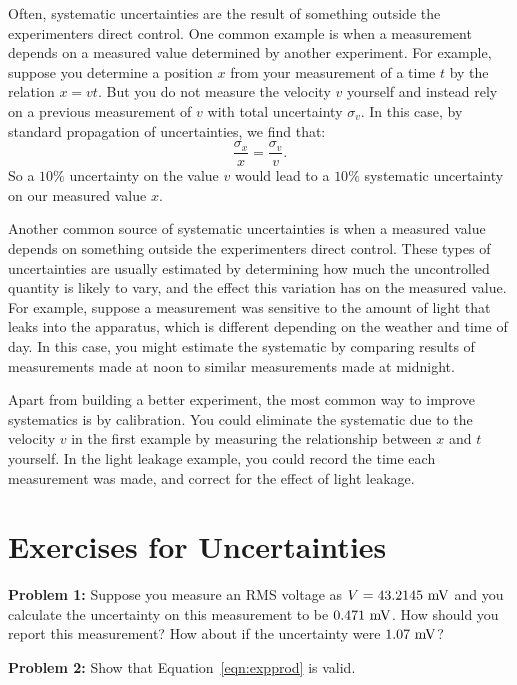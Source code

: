 \documentclass[12pt,oneside]{book}
\begin{document}
Often, systematic uncertainties are the result of something outside
the experimenters direct control.  One common example is when a
measurement depends on a measured value determined by another
experiment.  For example, suppose you determine a position $x$ from
your measurement of a time $t$ by the relation $x = v t$.  But you do
not measure the velocity $v$ yourself and instead rely on a previous
measurement of $v$ with total uncertainty $\sigma_v$.  In this case,
by standard propagation of uncertainties, we find that:
\begin{displaymath}
\frac{\sigma_x}{x} = \frac{\sigma_v}{v}.
\end{displaymath}
So a $10\%$ uncertainty on the value $v$ would lead to a $10\%$ systematic uncertainty on our measured value $x$.

Another common source of systematic uncertainties is when a measured
value depends on something outside the experimenters direct control.
These types of uncertainties are usually estimated by determining how
much the uncontrolled quantity is likely to vary, and the effect this
variation has on the measured value.  For example, suppose a
measurement was sensitive to the amount of light that leaks into the
apparatus, which is different depending on the weather and time of
day.  In this case, you might estimate the systematic by comparing
results of measurements made at noon to similar measurements made at
midnight.

Apart from building a better experiment, the most common way to
improve systematics is by calibration.  You could eliminate the
systematic due to the velocity $v$ in the first example by measuring
the relationship between $x$ and $t$ yourself.  In the light leakage
example, you could record the time each measurement was made, and
correct for the effect of light leakage.

\section{Exercises for Uncertainties}


\noindent
{\bf Problem 1:}  Suppose you measure an RMS voltage as $V = 43.2145~\rm mV$ and you calculate the uncertainty on this measurement to be $0.471~\rm mV$.  How should you report this measurement?  How about if the uncertainty were $1.07~\rm mV$? \\ \vskip 0.25cm

\noindent
{\bf Problem 2:}  Show that Equation~\ref{eqn:expprod} is valid. \\ \vskip 0.25cm
\end{document}
